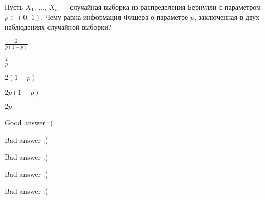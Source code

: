 
\begin{question}
Пусть \(X_1, \, \ldots, \, X_n\) --- случайная выборка из распределения
Бернулли с параметром \(p \in (0;\,1)\). Чему равна информация Фишера о
параметре \(p\), заключенная в двух наблюдениях случайной выборки?
\begin{answerlist}
  \item \(\tfrac{2}{p(1-p)}\)
  \item \(\tfrac{2}{p}\)
  \item \(2(1 - p)\)
  \item \(2p(1-p)\)
  \item \(2p\)
\end{answerlist}
\end{question}

\begin{solution}
\begin{answerlist}
  \item Good answer :)
  \item Bad answer :(
  \item Bad answer :(
  \item Bad answer :(
  \item Bad answer :(
\end{answerlist}
\end{solution}

